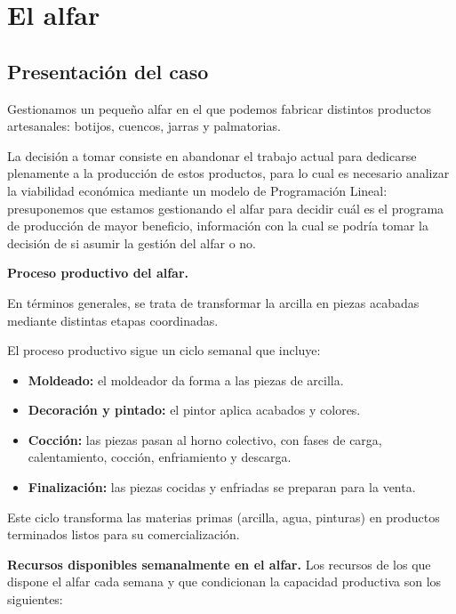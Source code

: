 \section{El alfar}

\subsection{Presentación del caso}


Gestionamos un pequeño alfar en el que podemos fabricar distintos productos artesanales: botijos, cuencos, jarras y palmatorias.

La decisión a tomar consiste en abandonar el trabajo actual para dedicarse plenamente a la producción de estos productos, para lo cual es necesario analizar la viabilidad económica mediante un modelo de Programación Lineal: presuponemos que estamos gestionando el alfar para decidir cuál es el programa de producción de mayor beneficio, información con la cual se podría tomar la decisión de si asumir la gestión del alfar o no.


\textbf{Proceso productivo del alfar.}

En términos generales, se trata de transformar la arcilla en piezas acabadas mediante distintas etapas coordinadas.

El proceso productivo sigue un ciclo semanal que incluye:

\begin{itemize}

    \item \textbf{Moldeado:} el moldeador da forma a las piezas de arcilla.

    \item \textbf{Decoración y pintado:} el pintor aplica acabados y colores.

    \item \textbf{Cocción:} las piezas pasan al horno colectivo, con fases de carga, calentamiento, cocción, enfriamiento y descarga.

    \item \textbf{Finalización:} las piezas cocidas y enfriadas se preparan para la venta.

\end{itemize}

Este ciclo transforma las materias primas (arcilla, agua, pinturas) en productos terminados listos para su comercialización.


\textbf{Recursos disponibles semanalmente en el alfar.}
Los recursos de los que dispone el alfar cada semana y que condicionan la capacidad productiva son los siguientes:


